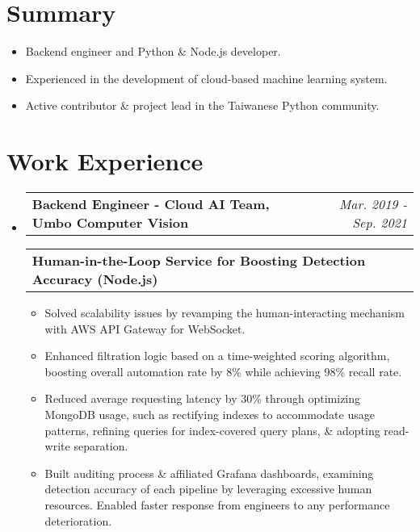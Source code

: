 \documentclass[letterpaper,11pt]{article}
\makeatletter
\newcommand{\resumeItem}[1]{
  \item\small{
    {#1 \vspace{-2pt}}
  }
}
\newcommand{\resumeSubheading}[2]{
  \vspace{-2pt}\item
    \begin{tabular*}{0.97\textwidth}[t]{l@{\extracolsep{\fill}}r}
      \textbf{#1} & \textit{\small #2} \\
    \end{tabular*}\vspace{-5pt}
}
\newcommand{\resumeSubSubheading}[1]{
    \begin{tabular*}{0.97\textwidth}{l@{\extracolsep{\fill}}r}
      \textbf{\small#1} \\
    \end{tabular*}\vspace{-5pt} 
}
\newcommand{\resumeSubHeadingListStart}{\begin{itemize}[leftmargin=*, label={}]}
\newcommand{\resumeItemListStart}{\begin{itemize}}
\newcommand{\resumeItemListEnd}{\end{itemize}\vspace{-5pt}}
\makeatother
\begin{document}
\section{Summary}
  \begin{itemize}[leftmargin=16px]
    \item\small{{Backend engineer and Python \& Node.js developer.  \vspace{-8pt}}}
    \item\small{{Experienced in the development of cloud-based machine learning system.  \vspace{-8pt}}}
    \item\small{{Active contributor \& project lead in the Taiwanese Python community.   \vspace{-8pt}}}
  \resumeItemListEnd

\vspace{8pt}
\section{Work Experience}
  \resumeSubHeadingListStart
    \resumeSubheading
      {Backend Engineer - Cloud AI Team, Umbo Computer Vision}{Mar. 2019 - Sep. 2021}
      
      \vspace{4px}
      \resumeSubSubheading
        {\hspace{4px}Human-in-the-Loop Service for Boosting Detection Accuracy (Node.js)}
        \resumeItemListStart
          \resumeItem{Solved scalability issues by revamping the human-interacting mechanism with AWS API Gateway for WebSocket.}
          \resumeItem{Enhanced filtration logic based on a time-weighted scoring algorithm, boosting overall automation rate by 8\% while achieving 98\% recall rate.}
          \resumeItem{Reduced average requesting latency by 30\% through optimizing MongoDB usage, such as rectifying indexes to accommodate usage patterns, refining queries for index-covered query plans, \& adopting read-write separation.}
          \resumeItem{Built auditing process \& affiliated Grafana dashboards, examining detection accuracy of each pipeline by leveraging excessive human resources. Enabled faster response from engineers to any performance deterioration.}
        \resumeItemListEnd


\end{itemize}
\end{document}
